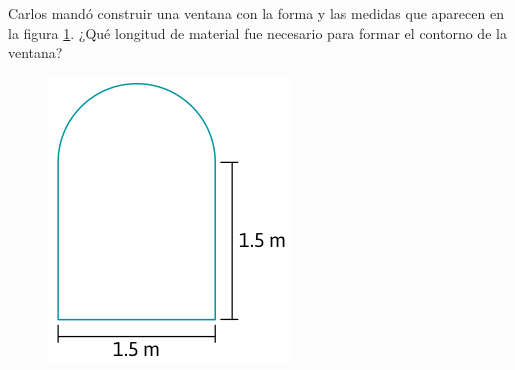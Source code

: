 Carlos mandó construir una ventana con la forma y las medidas que aparecen en
la figura \ref{fig:ventana}. ¿Qué longitud de material fue necesario para formar el contorno de la ventana?

\begin{figure}[H]
    \centering
    \includegraphics[width=.5\linewidth]{../images/ventana}
    \label{fig:ventana}
\end{figure}